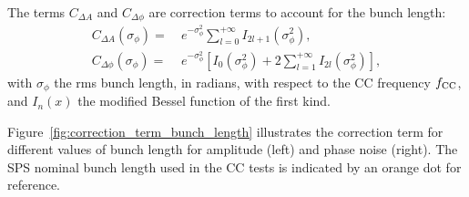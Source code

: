The terms $C_{\Delta A}$ and $C_{\Delta \phi}$ are correction terms to account for the bunch length:
\begin{align}
C_{\Delta A}(\sigma_{\phi}) = ~& e^{-\sigma_{\phi}^2}\sum_{l=0}^{+\infty} I_{2l+1}(\sigma_{\phi}^2),\\
C_{\Delta \phi}(\sigma_{\phi}) = ~& e^{-\sigma_{\phi}^2} \left[I_0(\sigma_{\phi}^2) + 2 \sum_{l=1}^{+\infty} I_{2l}(\sigma_{\phi}^2) \right],
\end{align}
with $\sigma_{\phi}$ the rms bunch length, in radians, with respect to the CC frequency ${f_\mathrm{CC}}$, and $I_n(x)$ the modified Bessel function of the first kind. 

Figure~\ref{fig:correction_term_bunch_length} illustrates the correction term for different values of bunch length for amplitude (left) and phase noise  (right). The SPS nominal bunch length used in the CC tests is indicated by an orange dot for reference.


